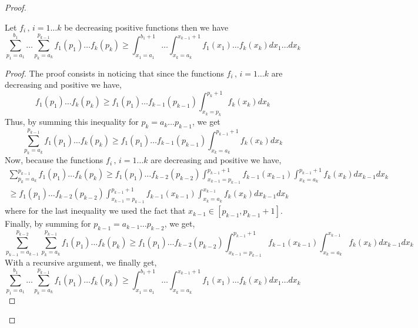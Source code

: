 \begin{proof}
\begin{lemma} 
\label{lemma_two}
Let $f_i \,, \,i = 1 \ldots k$ be decreasing positive functions then we have 
\begin{equation}
    \sum_{p_1=a_1}^{b_1} \ldots \sum_{p_k=a_k}^{p_{k-1}} f_1(p_1) \ldots f_k(p_k)
    \geq \int_{x_1=a_1}^{b_1+1} \ldots \int_{x_k = a_k}^{x_{k-1}+1}  f_1(x_1) \ldots f_k(x_k) dx_1\dots dx_k
\end{equation}
\end{lemma}
\begin{proof}
    The proof consists in noticing that since the functions $f_i \,, \,i = 1 \ldots k$ are decreasing and positive we have, 
    \begin{equation}
        f_1(p_1) \ldots f_k(p_k) \geq  f_1(p_1) \ldots  f_{k-1}(p_{k-1})\int_{x_k = p_k}^{p_k+1} f_k(x_k) dx_k
    \end{equation}
    Thus, by summing this inequality for $p_k= a_k \ldots p_{k-1}$, we get
    \begin{equation}
    \sum_{p_k=a_k}^{p_{k-1}} f_1(p_1) \ldots f_k(p_k)
    \geq  f_1(p_1) \ldots  f_{k-1}(p_{k-1})  \int_{x_k = a_k}^{p_{k-1}+1} f_k(x_k) dx_k
    \end{equation}
    Now, because the functions $f_i \,, \,i = 1 \ldots k$ are decreasing and positive we have, 
     \begin{align}
    \sum_{p_k=a_k}^{p_{k-1}} f_1(p_1) \ldots f_k(p_k)
    \geq  f_1(p_1) \ldots  f_{k-2}(p_{k-2})  \int_{x_{k-1} = p_{k-1}}^{p_{k-1}+1} f_{k-1}(x_{k-1})  \int_{x_k = a_k}^{p_{k-1}+1} f_k(x_k) dx_{k-1}dx_k \\
    \geq f_1(p_1) \ldots  f_{k-2}(p_{k-2})  \int_{x_{k-1} = p_{k-1}}^{p_{k-1}+1} f_{k-1}(x_{k-1})  \int_{x_k = a_k}^{x_{k-1}} f_k(x_k) dx_{k-1}dx_k 
    \end{align}
    where for the last inequality we used the fact that $x_{k-1} \in [p_{k-1}, p_{k-1}+1]$.
    Finally, by summing for $p_{k-1} = a_{k-1} \ldots p_{k-2}$, we get,
    \begin{equation}
    \sum_{p_{k-1}=a_{k-1}}^{p_{k-2}}  \sum_{p_k=a_k}^{p_{k-1}} f_1(p_1) \ldots f_k(p_k)
    \geq f_1(p_1) \ldots  f_{k-2}(p_{k-2})  \int_{x_{k-1} = p_{k-1}}^{p_{k-1}+1} f_{k-1}(x_{k-1})  \int_{x_k = a_k}^{x_{k-1}} f_k(x_k) dx_{k-1}dx_k
    \end{equation}
    With a recursive argument, we finally get,
    \begin{equation}
    \sum_{p_1=a_1}^{b_1} \ldots \sum_{p_k=a_k}^{p_{k-1}} f_1(p_1) \ldots f_k(p_k)
    \geq \int_{x_1=a_1}^{b_1+1} \ldots \int_{x_k = a_k}^{x_{k-1}+1}  f_1(x_1) \ldots f_k(x_k) dx_1\dots dx_k
\end{equation}
\end{proof}

\end{proof}